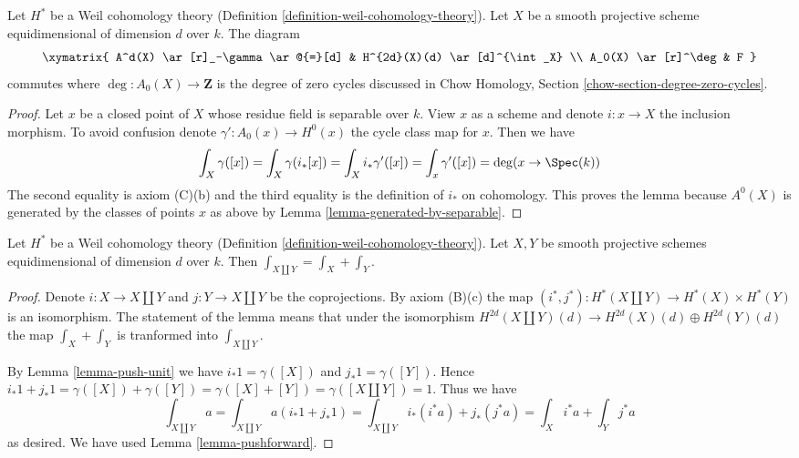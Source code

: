 \begin{lemma}
\label{lemma-degrees-cycles}
Let $H^*$ be a Weil cohomology theory
(Definition \ref{definition-weil-cohomology-theory}).
Let $X$ be a smooth projective scheme equidimensional of dimension $d$
over $k$. The diagram
$$
\xymatrix{
A^d(X) \ar[r]_-\gamma \ar@{=}[d] &
H^{2d}(X)(d) \ar[d]^{\int_X} \\
A_0(X) \ar[r]^\deg & F
}
$$
commutes where $\deg : A_0(X) \to \mathbf{Z}$ is the degree of
zero cycles discussed in Chow Homology, Section
\ref{chow-section-degree-zero-cycles}.
\end{lemma}

\begin{proof}
Let $x$ be a closed point of $X$ whose residue field is separable
over $k$. View $x$ as a scheme and denote
$i : x \to X$ the inclusion morphism. To avoid confusion denote
$\gamma' : A_0(x) \to H^0(x)$ the cycle class map for $x$.
Then we have
$$
\int_X \gamma([x]) = \int_X \gamma(i_*[x]) =
\int_X i_*\gamma'([x]) = \int_x \gamma'([x]) = \deg(x \to \Spec(k))
$$
The second equality is axiom (C)(b) and the third equality is
the definition of $i_*$ on cohomology. This proves the lemma
because $A^0(X)$ is generated by the classes of points $x$ as above
by Lemma \ref{lemma-generated-by-separable}.
\end{proof}

\begin{lemma}
\label{lemma-trace-disjoint-union}
Let $H^*$ be a Weil cohomology theory
(Definition \ref{definition-weil-cohomology-theory}).
Let $X, Y$ be smooth projective schemes equidimensional of dimension $d$
over $k$. Then $\int_{X \amalg Y} = \int_X + \int_Y$.
\end{lemma}

\begin{proof}
Denote $i : X \to X \amalg Y$ and $j : Y \to X \amalg Y$ be the coprojections.
By axiom (B)(c) the map
$(i^*, j^*) : H^*(X \amalg Y) \to H^*(X) \times H^*(Y)$ is an isomorphism.
The statement of the lemma means that under the isomorphism
$H^{2d}(X \amalg Y)(d) \to H^{2d}(X)(d) \oplus H^{2d}(Y)(d)$
the map $\int_X + \int_Y$ is tranformed into $\int_{X \amalg Y}$.

\medskip\noindent
By Lemma \ref{lemma-push-unit} we have $i_*1 = \gamma([X])$ and
$j_*1 = \gamma([Y])$. Hence $i_*1 + j_*1 = \gamma([X]) + \gamma([Y]) =
\gamma([X] + [Y]) = \gamma([X \amalg Y]) = 1$. Thus we have
$$
\int_{X \amalg Y} a =
\int_{X \amalg Y} a(i_*1 + j_*1) =
\int_{X \amalg Y} i_*(i^*a) + j_*(j^*a) =
\int_X i^*a +
\int_Y j^*a
$$
as desired. We have used Lemma \ref{lemma-pushforward}.
\end{proof}

